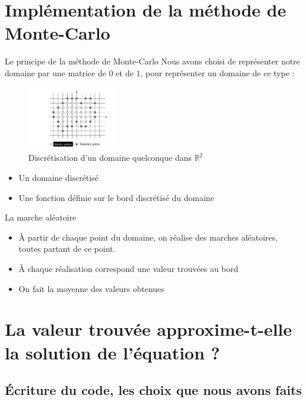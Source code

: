 \documentclass{beamer}
\begin{document}
\section[Implémentation du schéma numérique]{Implémentation de la méthode de Monte-Carlo}

\begin{frame}{Le principe de la méthode de Monte-Carlo}
    Nous avons choisi de représenter notre domaine par une matrice de $0$ et de $1$, pour représenter un domaine de ce type :
    \begin{figure}[htp]
        \centering
        \includegraphics[width=4cm]{domainediscretmatrice}
        \caption{Discrétisation d'un domaine quelconque dans $\mathbb{R}^2$}
        \label{Domaine discret}
    \end{figure}
    \pause
    \begin{itemize}
        \item Un domaine discrétisé
        \pause
        \item Une fonction définie sur le bord discrétisé du domaine
    \end{itemize}
\end{frame}

\begin{frame}{La marche aléatoire}
    \begin{itemize}
        \item À partir de chaque point du domaine, on réalise des marches
            aléatoires, toutes partant de ce point.
        \pause
        \item À chaque réalisation correspond une valeur trouvées au bord
        \pause
        \item On fait la moyenne des valeurs obtenues
    \end{itemize}
\end{frame}

\section{La valeur trouvée approxime-t-elle la solution de l'équation ?}

\subsection{Écriture du code, les choix que nous avons faits}
\end{document}
